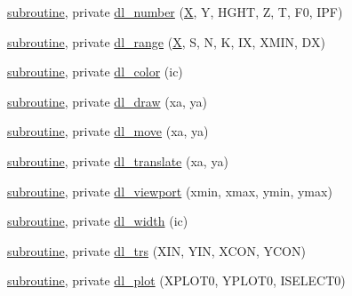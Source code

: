 \begin{DoxyCompactItemize}
\item 
\hyperlink{M__stopwatch_83_8txt_acfbcff50169d691ff02d4a123ed70482}{subroutine}, private \hyperlink{namespacem__pixel__slices_a7d9372496e88c384aea5ad1b26750d1b}{dl\+\_\+number} (\hyperlink{intro__blas1_83_8txt_ac8596739bc875e90fe6e2ecf98e87906}{X}, Y, H\+G\+HT, Z, T, F0, I\+PF)
\item 
\hyperlink{M__stopwatch_83_8txt_acfbcff50169d691ff02d4a123ed70482}{subroutine}, private \hyperlink{namespacem__pixel__slices_a47408b6c6411a3c3cb3419b319e57978}{dl\+\_\+range} (\hyperlink{intro__blas1_83_8txt_ac8596739bc875e90fe6e2ecf98e87906}{X}, S, N, K, IX, X\+M\+IN, DX)
\item 
\hyperlink{M__stopwatch_83_8txt_acfbcff50169d691ff02d4a123ed70482}{subroutine}, private \hyperlink{namespacem__pixel__slices_a8e362bf8eea80faddc97f7d137c95f9c}{dl\+\_\+color} (ic)
\item 
\hyperlink{M__stopwatch_83_8txt_acfbcff50169d691ff02d4a123ed70482}{subroutine}, private \hyperlink{namespacem__pixel__slices_acafdf0174290a0e231ca120f6305b5d0}{dl\+\_\+draw} (xa, ya)
\item 
\hyperlink{M__stopwatch_83_8txt_acfbcff50169d691ff02d4a123ed70482}{subroutine}, private \hyperlink{namespacem__pixel__slices_ab9e9530d7fb4fbea1bc5d52744498731}{dl\+\_\+move} (xa, ya)
\item 
\hyperlink{M__stopwatch_83_8txt_acfbcff50169d691ff02d4a123ed70482}{subroutine}, private \hyperlink{namespacem__pixel__slices_ad35fa14bd29e8e895f22de6500b6b5ff}{dl\+\_\+translate} (xa, ya)
\item 
\hyperlink{M__stopwatch_83_8txt_acfbcff50169d691ff02d4a123ed70482}{subroutine}, private \hyperlink{namespacem__pixel__slices_a87a664883c6c5e0e2812df4d1ea29515}{dl\+\_\+viewport} (xmin, xmax, ymin, ymax)
\item 
\hyperlink{M__stopwatch_83_8txt_acfbcff50169d691ff02d4a123ed70482}{subroutine}, private \hyperlink{namespacem__pixel__slices_a2a4bb6da0ae36c65fdf05996e3ae5487}{dl\+\_\+width} (ic)
\item 
\hyperlink{M__stopwatch_83_8txt_acfbcff50169d691ff02d4a123ed70482}{subroutine}, private \hyperlink{namespacem__pixel__slices_a141b4da9ce5a0d633cc488f656c0320d}{dl\+\_\+trs} (X\+IN, Y\+IN, X\+C\+ON, Y\+C\+ON)
\item 
\hyperlink{M__stopwatch_83_8txt_acfbcff50169d691ff02d4a123ed70482}{subroutine}, private \hyperlink{namespacem__pixel__slices_aa70737b5f5945b2f513163ee5c40942d}{dl\+\_\+plot} (X\+P\+L\+O\+T0, Y\+P\+L\+O\+T0, I\+S\+E\+L\+E\+C\+T0)
\item 

\end{DoxyCompactItemize}

